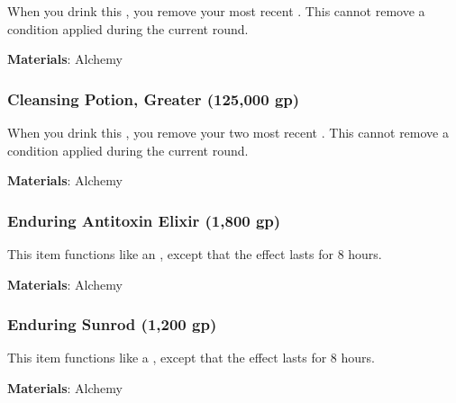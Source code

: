 When you drink this , you remove your most recent .
This cannot remove a condition applied during the current round.



\vspace{0.25em}
\textbf{Materials}: Alchemy


\lowercase{\hypertarget{item:Cleansing Potion, Greater}{}}\label{item:Cleansing Potion, Greater}
\hypertarget{item:Cleansing Potion, Greater}{\subsubsection{Cleansing Potion, Greater\hfill{} (125,000 gp)}}

When you drink this , you remove your two most recent .
This cannot remove a condition applied during the current round.



\vspace{0.25em}
\textbf{Materials}: Alchemy


\lowercase{\hypertarget{item:Enduring Antitoxin Elixir}{}}\label{item:Enduring Antitoxin Elixir}
\hypertarget{item:Enduring Antitoxin Elixir}{\subsubsection{Enduring Antitoxin Elixir\hfill{} (1,800 gp)}}

This item functions like an , except that the effect lasts for 8 hours.



\vspace{0.25em}
\textbf{Materials}: Alchemy


\lowercase{\hypertarget{item:Enduring Sunrod}{}}\label{item:Enduring Sunrod}
\hypertarget{item:Enduring Sunrod}{\subsubsection{Enduring Sunrod\hfill{} (1,200 gp)}}

This item functions like a , except that the effect lasts for 8 hours.



\vspace{0.25em}
\textbf{Materials}: Alchemy


